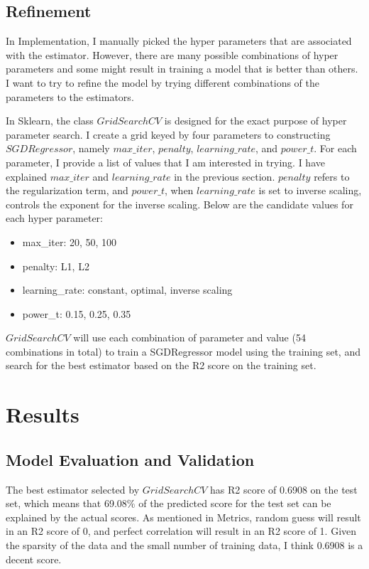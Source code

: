 \documentclass{article}
\begin{document}
\subsection{Refinement}
In Implementation, I manually picked the hyper parameters that are associated with the estimator. However, there are many possible combinations of hyper parameters and some might result in training a model that is better than others. I want to try to refine the model by trying different combinations of the parameters to the estimators.

In Sklearn, the class $GridSearchCV$ is designed for the exact purpose of hyper parameter search. I create a grid keyed by four parameters to constructing $SGDRegressor$, namely $max\_iter$, $penalty$, $learning\_rate$, and $power\_t$. For each parameter, I provide a list of values that I am interested in trying. I have explained $max\_iter$ and $learning\_rate$ in the previous section. $penalty$ refers to the regularization term, and $power\_t$, when $learning\_rate$ is set to inverse scaling, controls the exponent for the inverse scaling. Below are the candidate values for each hyper parameter:

\begin{itemize}
  \item max\_iter:
  20, 50, 100
  \item penalty:
  L1, L2
  \item learning\_rate:
  constant, optimal, inverse scaling
  \item power\_t:
  0.15, 0.25, 0.35
\end{itemize}

$GridSearchCV$ will use each combination of parameter and value (54 combinations in total) to train a SGDRegressor model using the training set, and search for the best estimator based on the R2 score on the training set.

\section{Results}
\subsection{Model Evaluation and Validation}
The best estimator selected by $GridSearchCV$ has R2 score of 0.6908 on the test set, which means that 69.08\% of the predicted score for the test set can be explained by the actual scores. As mentioned in Metrics, random guess will result in an R2 score of 0, and perfect correlation will result in an R2 score of 1. Given the sparsity of the data and the small number of training data, I think 0.6908 is a decent score.
\end{document}
